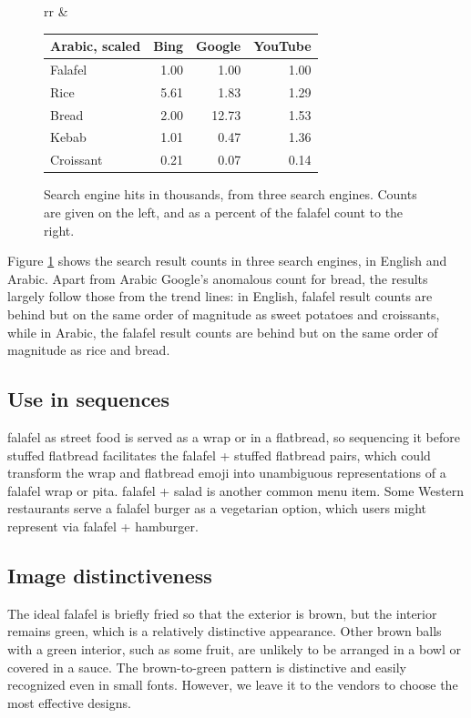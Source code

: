 \documentclass[a4paper,10pt]{article}
\begin{document}
\begin{figure}
\begin{tabular}{rr}
&
\begin{tabular}{l|rrr}
{\bf Arabic, scaled} & Bing & Google & YouTube \\\hline
Falafel & 1.00 & 1.00  & 	1.00\\
Rice & 5.61 & 1.83	 &  1.29\\
Bread & 2.00 & 12.73 &    1.53\\
Kebab & 1.01 & 0.47	 &  1.36\\
Croissant & 0.21 & 0.07	 &  0.14
\end{tabular}

\end{tabular}
\caption{Search engine hits in thousands, from three search engines. Counts are given on
the left, and as a percent of the falafel count to the right.}
\label{counttab}

\end{figure}

Figure \ref{counttab} shows the search result counts in three search engines, in English
and Arabic. Apart from Arabic Google's anomalous count for bread, the results largely
follow those from the trend lines: in English, falafel result counts are behind but
on the same order of magnitude as sweet potatoes and croissants, while in Arabic, the
falafel result counts are behind but on the same order of magnitude as rice and bread.


\subsection{Use in sequences}\label{seqsec}
{\sc falafel} as street food is served as a wrap or in a flatbread, so sequencing it before {\sc stuffed flatbread}
facilitates the {\sc falafel}
+ {\sc stuffed flatbread} pairs, which could transform the wrap and flatbread emoji
into unambiguous representations of a falafel wrap or pita. {\sc falafel} + {\sc salad} is
another common menu item. Some Western restaurants serve a falafel burger as a vegetarian option,
which users might represent via {\sc falafel} + {\sc hamburger}.


\subsection{Image distinctiveness}
The ideal falafel is briefly fried so that the exterior is brown, but the interior
remains green, which is a relatively distinctive appearance. Other brown balls with
a green interior, such as some fruit, are unlikely to be arranged in a bowl or covered
in a sauce. The brown-to-green pattern is distinctive and easily recognized even in
small fonts. However, we leave it to the vendors to choose the most effective designs.
\end{document}
